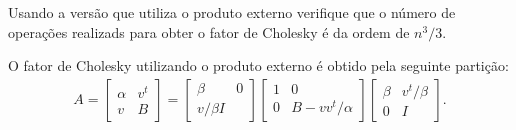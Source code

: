 \documentclass[a4paper,12pt, leqno, answers]{exam}
\begin{document}
\begin{questions}
     Usando a vers\~{a}o que utiliza o produto externo verifique que o n\'{u}mero de opera\c{c}\~{o}es realizads para obter o fator de Cholesky \'{e} da ordem de $n^3 / 3$.
    \begin{solution}
        O fator de Cholesky utilizando o produto externo \'{e} obtido pela seguinte parti\c{c}\~{a}o:
        \begin{align*}
            A = \begin{bmatrix}
                \alpha & v^t \\
                v & B
            \end{bmatrix} = \begin{bmatrix}
                \beta & 0 \\
                v / \beta I
            \end{bmatrix} \begin{bmatrix}
                1 & 0 \\
                0 & B - v v^t / \alpha
            \end{bmatrix} \begin{bmatrix}
                \beta & v^t / \beta \\
                0 & I
            \end{bmatrix}.
        \end{align*}


\end{solution}
\end{questions}
\end{document}
